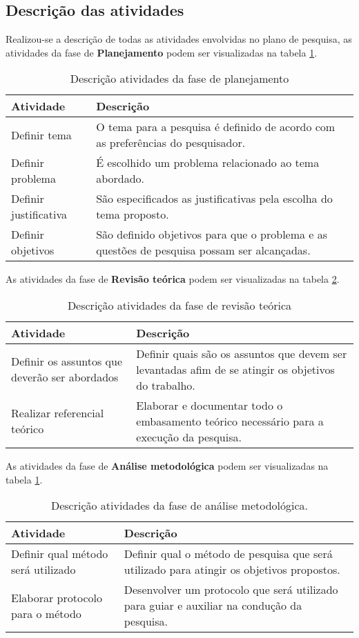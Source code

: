 \subsection{Descrição das atividades}
\label{descr-atv}
Realizou-se a descrição de todas as atividades envolvidas no plano de pesquisa, as atividades da fase de \textbf{Planejamento} podem ser visualizadas na tabela \ref{tab:fas-atv-plan}.
\begin{table}[H]
\center
\begin{tabular}{|l|p{8cm}|}
\hline
\textbf{Atividade} & \textbf{Descrição} \\ \hline
Definir tema & O tema para a pesquisa é definido de acordo com as preferências do pesquisador.\\ \hline
Definir problema & É escolhido um problema relacionado ao tema abordado.\\ \hline
Definir justificativa & São especificados as justificativas pela escolha do tema proposto. \\ \hline
Definir objetivos & São definido objetivos para que o problema e as questões de pesquisa possam ser alcançadas.\\ \hline
\end{tabular}
\caption{Descrição atividades da fase de planejamento}
\label{tab:fas-atv-plan}
\end{table}

As atividades da fase de \textbf{Revisão teórica} podem ser visualizadas na tabela \ref{tab:fas-atv-rev}.

\begin{table}[H]
\center
\begin{tabular}{|l|p{8cm}|}
\hline
\textbf{Atividade} & \textbf{Descrição} \\ \hline
Definir os assuntos que deverão ser abordados & Definir quais são os assuntos que devem ser levantadas afim de se atingir os objetivos do trabalho.\\ \hline
Realizar referencial teórico & Elaborar e documentar todo o embasamento teórico necessário para a execução da pesquisa. \\ \hline
\end{tabular}
\caption{Descrição atividades da fase de revisão teórica}
\label{tab:fas-atv-rev}
\end{table}

As atividades da fase de \textbf{Análise metodológica} podem ser visualizadas na tabela \ref{tab:fas-atv-plan}.

\begin{table}[H]
\center
\begin{tabular}{|l|p{8cm}|}
\hline
\textbf{Atividade} & \textbf{Descrição} \\ \hline
		Definir qual método será utilizado & Definir qual o método de pesquisa que será utilizado para atingir os objetivos propostos. \\ \hline
		Elaborar protocolo para o método & Desenvolver um protocolo que será utilizado para guiar e auxiliar na condução da pesquisa. \\ \hline
\end{tabular}
\caption{Descrição atividades da fase de análise metodológica.}
\label{tab:fas-atv-ana-met}
\end{table}

